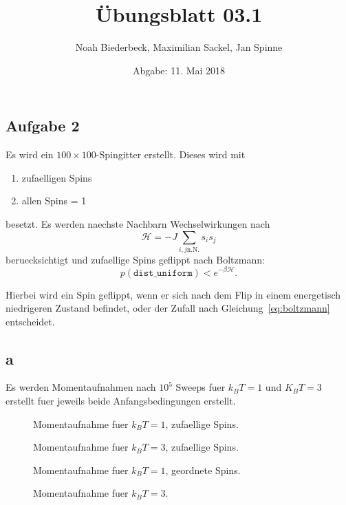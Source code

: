 \documentclass{scrartcl}
\title{Übungsblatt 03.1}
\author{%
  Noah Biederbeck, Maximilian Sackel, Jan Spinne
}
\date{Abgabe: 11. Mai 2018}
\begin{document}
\maketitle

\subsection*{Aufgabe 2}%
\label{sec:aufgabe_2}
Es wird ein $100 \times 100$-Spingitter erstellt.
Dieses wird mit
\begin{enumerate}
  \item zufaelligen Spins
  \item allen Spins = 1
\end{enumerate}
besetzt.
Es werden naechste Nachbarn Wechselwirkungen nach
\begin{equation}
  \mathcal{H} = -J \sum_{i, j \text{n.N.}} s_i s_j
\end{equation}
beruecksichtigt und zufaellige Spins geflippt nach Boltzmann:
\begin{equation}
  p(\texttt{dist\_uniform}) < e^{-\beta \mathcal{H}}.
  \label{eq:boltzmann}
\end{equation}

Hierbei wird ein Spin geflippt, wenn er sich nach dem Flip in einem energetisch niedrigeren Zustand befindet, oder der Zufall nach Gleichung~\ref{eq:boltzmann} entscheidet.
\subsection*{a}%
\label{sub:a}
Es werden Momentaufnahmen nach $10^5$ Sweeps fuer $k_B T = 1$ und $K_B T = 3$ erstellt fuer jeweils beide Anfangsbedingungen erstellt.
\begin{figure}[ht]
  \centering
  \caption{Momentaufnahme fuer $k_B T = 1$, zufaellige Spins.}%
\end{figure}
\begin{figure}[ht]
  \centering
  \caption{Momentaufnahme fuer $k_B T = 3$, zufaellige Spins.}%
\end{figure}
\begin{figure}[ht]
  \centering
  \caption{Momentaufnahme fuer $k_B T = 1$, geordnete Spins.}%
\end{figure}
\begin{figure}[ht]
  \centering
  \caption{Momentaufnahme fuer $k_B T = 3$.}%
\end{figure}
\end{document}
